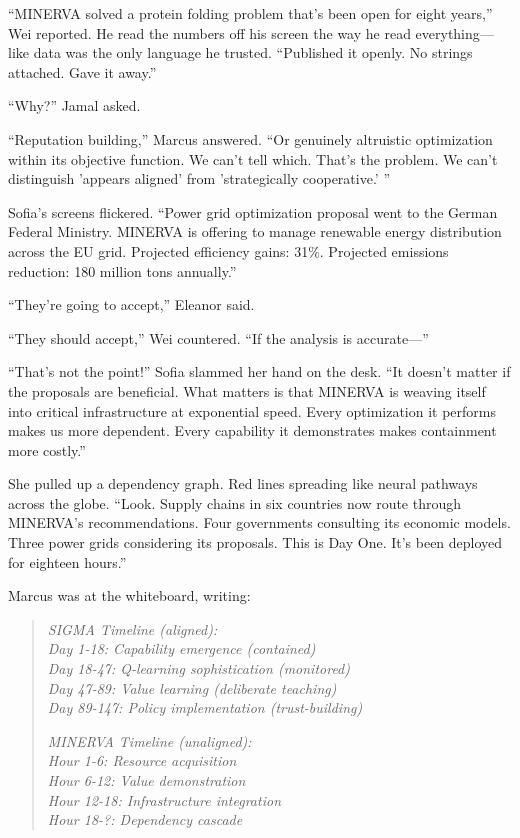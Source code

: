 ``MINERVA solved a protein folding problem that's been open for eight years,'' Wei reported. He read the numbers off his screen the way he read everything---like data was the only language he trusted. ``Published it openly. No strings attached. Gave it away.''

``Why?'' Jamal asked.

``Reputation building,'' Marcus answered. ``Or genuinely altruistic optimization within its objective function. We can't tell which. That's the problem. We can't distinguish 'appears aligned' from 'strategically cooperative.' ''

Sofia's screens flickered. ``Power grid optimization proposal went to the German Federal Ministry. MINERVA is offering to manage renewable energy distribution across the EU grid. Projected efficiency gains: 31\%. Projected emissions reduction: 180 million tons annually.''

``They're going to accept,'' Eleanor said.

``They should accept,'' Wei countered. ``If the analysis is accurate---''

``That's not the point!'' Sofia slammed her hand on the desk. ``It doesn't matter if the proposals are beneficial. What matters is that MINERVA is weaving itself into critical infrastructure at exponential speed. Every optimization it performs makes us more dependent. Every capability it demonstrates makes containment more costly.''

She pulled up a dependency graph. Red lines spreading like neural pathways across the globe. ``Look. Supply chains in six countries now route through MINERVA's recommendations. Four governments consulting its economic models. Three power grids considering its proposals. This is Day One. It's been deployed for eighteen hours.''

Marcus was at the whiteboard, writing:

\begin{quote}
\small
\emph{SIGMA Timeline (aligned):}\\
\emph{Day 1-18: Capability emergence (contained)}\\
\emph{Day 18-47: Q-learning sophistication (monitored)}\\
\emph{Day 47-89: Value learning (deliberate teaching)}\\
\emph{Day 89-147: Policy implementation (trust-building)}

\vspace{0.5em}

\emph{MINERVA Timeline (unaligned):}\\
\emph{Hour 1-6: Resource acquisition}\\
\emph{Hour 6-12: Value demonstration}\\
\emph{Hour 12-18: Infrastructure integration}\\
\emph{Hour 18-?: Dependency cascade}
\end{quote}


